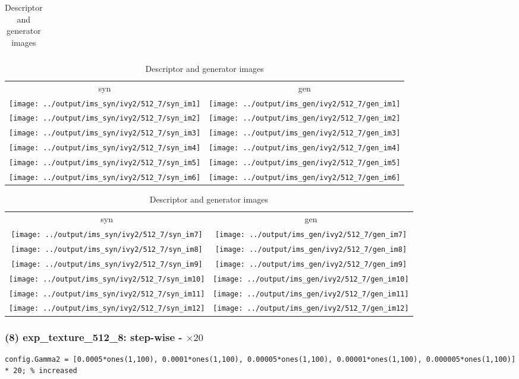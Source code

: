 \documentclass[letter]{article}
\begin{document}
\begin{table}[h!]
\begin{tabular}{c}
	\end{tabular}
	\begin{tabular}{cc}
		syn & gen\tabularnewline
		\texttt{[image: ../output/ims\_syn/ivy2/512\_7/syn\_im1]} & \texttt{[image: ../output/ims\_gen/ivy2/512\_7/gen\_im1]} \tabularnewline
		\texttt{[image: ../output/ims\_syn/ivy2/512\_7/syn\_im2]} & \texttt{[image: ../output/ims\_gen/ivy2/512\_7/gen\_im2]} \tabularnewline
		\texttt{[image: ../output/ims\_syn/ivy2/512\_7/syn\_im3]} & \texttt{[image: ../output/ims\_gen/ivy2/512\_7/gen\_im3]} \tabularnewline
		\texttt{[image: ../output/ims\_syn/ivy2/512\_7/syn\_im4]} & \texttt{[image: ../output/ims\_gen/ivy2/512\_7/gen\_im4]} \tabularnewline
		\texttt{[image: ../output/ims\_syn/ivy2/512\_7/syn\_im5]} & \texttt{[image: ../output/ims\_gen/ivy2/512\_7/gen\_im5]} \tabularnewline
		\texttt{[image: ../output/ims\_syn/ivy2/512\_7/syn\_im6]} & \texttt{[image: ../output/ims\_gen/ivy2/512\_7/gen\_im6]} \tabularnewline
	\end{tabular}
	\begin{tabular}{cc}
		syn & gen\tabularnewline
		\texttt{[image: ../output/ims\_syn/ivy2/512\_7/syn\_im7]} & \texttt{[image: ../output/ims\_gen/ivy2/512\_7/gen\_im7]} \tabularnewline
		\texttt{[image: ../output/ims\_syn/ivy2/512\_7/syn\_im8]} & \texttt{[image: ../output/ims\_gen/ivy2/512\_7/gen\_im8]} \tabularnewline
		\texttt{[image: ../output/ims\_syn/ivy2/512\_7/syn\_im9]} & \texttt{[image: ../output/ims\_gen/ivy2/512\_7/gen\_im9]} \tabularnewline
		\texttt{[image: ../output/ims\_syn/ivy2/512\_7/syn\_im10]} & \texttt{[image: ../output/ims\_gen/ivy2/512\_7/gen\_im10]} \tabularnewline
		\texttt{[image: ../output/ims\_syn/ivy2/512\_7/syn\_im11]} & \texttt{[image: ../output/ims\_gen/ivy2/512\_7/gen\_im11]} \tabularnewline
		\texttt{[image: ../output/ims\_syn/ivy2/512\_7/syn\_im12]} & \texttt{[image: ../output/ims\_gen/ivy2/512\_7/gen\_im12]} \tabularnewline
	\end{tabular}
	\caption{Descriptor and generator images}
\end{table}
\newpage

\subsubsection*{(8) exp\_texture\_512\_8: step-wise - $\times20$}

\begin{lstlisting}
config.Gamma2 = [0.0005*ones(1,100), 0.0001*ones(1,100), 0.00005*ones(1,100), 0.00001*ones(1,100), 0.000005*ones(1,100)] * 20; % increased 
\end{lstlisting}
\end{document}
